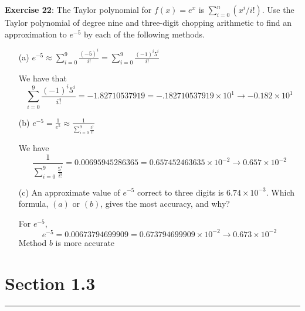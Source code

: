 \documentclass{article}
\begin{document}
\textbf{Exercise 22}:
    The Taylor polynomial for $f(x) = e^{x}$ is $\sum_{i = 0}^{n}(x^{i} / i!)$. Use the Taylor polynomial of degree nine and three-digit chopping arithmetic to find an approximation to $e^{-5}$ by each of the following methods.
        \begin{itemize}
            \item [(a)] $e^{-5} \approx \sum_{i = 0}^{9} \frac{(-5)^{i}}{i!} = \sum_{i = 0}^{9} \frac{(-1)^{i}5^{i}}{i!}$ 
                \begin{answer}
                    We have that 
                        \begin{equation*}
                            \sum_{i = 0}^{9} \dfrac{(-1)^{i}5^{i}}{i!} = -1.82710537919 = -.182710537919 \times 10^{1} \rightarrow -0.182 \times 10^{1}
                        \end{equation*}
                \end{answer}

            \item [(b)] $e^{-5} = \frac{1}{e^{5}} \approx \frac{1}{\sum_{i = 0}^{9} \frac{ 5^{i}}{i!}}$
                \begin{answer}
                    We have 
                        \begin{equation*}
                            \dfrac{1}{\sum_{i = 0}^{9}\frac{5^{i}}{i!}} = 0.00695945286365 = 0.657452463635 \times 10^{-2} \rightarrow 0.657 \times 10^{-2}
                        \end{equation*}
                \end{answer}

            \item [(c)] An approximate value of $e^{-5}$ correct to three digits is $6.74 \times 10^{-3}$. Which formula, $(a)$ or $(b)$, gives the most accuracy, and why? 
                \begin{answer}
                    For $e^{-5}$,
                        \begin{equation*}
                            e^{-5} = 0.00673794699909 = 0.673794699909 \times 10^{-2} \rightarrow 0.673 \times  10^{-2}
                        \end{equation*}
                    Method $b$ is more accurate
                \end{answer}
        \end{itemize}

\newpage
\section*{Section 1.3}
\hrule
\end{document}
